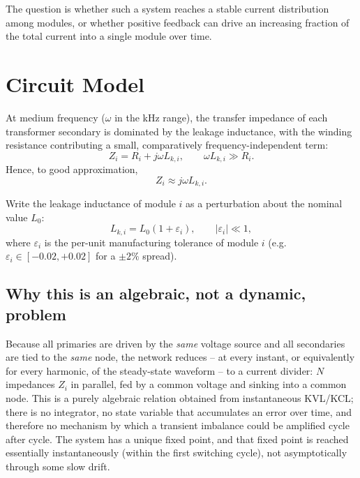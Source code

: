 \documentclass[11pt,a4paper]{article}
\begin{document}
The question is whether such a system reaches a stable current distribution among modules, or whether positive feedback can drive an increasing fraction of the total current into a single module over time.

\section{Circuit Model}

At medium frequency ($\omega$ in the kHz range), the transfer impedance of each transformer secondary is dominated by the leakage inductance, with the winding resistance contributing a small, comparatively frequency-independent term:
\begin{equation}
Z_i = R_i + j\omega L_{k,i}, \qquad \omega L_{k,i} \gg R_i .
\end{equation}
Hence, to good approximation,
\begin{equation}
Z_i \approx j\omega L_{k,i}.
\end{equation}

Write the leakage inductance of module $i$ as a perturbation about the nominal value $L_0$:
\begin{equation}
L_{k,i} = L_0\left(1+\varepsilon_i\right), \qquad |\varepsilon_i| \ll 1,
\end{equation}
where $\varepsilon_i$ is the per-unit manufacturing tolerance of module $i$ (e.g.\ $\varepsilon_i \in [-0.02, +0.02]$ for a $\pm 2\%$ spread).

\subsection{Why this is an algebraic, not a dynamic, problem}

Because all primaries are driven by the \emph{same} voltage source and all secondaries are tied to the \emph{same} node, the network reduces -- at every instant, or equivalently for every harmonic, of the steady-state waveform -- to a current divider: $N$ impedances $Z_i$ in parallel, fed by a common voltage and sinking into a common node. This is a purely algebraic relation obtained from instantaneous KVL/KCL; there is no integrator, no state variable that accumulates an error over time, and therefore no mechanism by which a transient imbalance could be amplified cycle after cycle. The system has a unique fixed point, and that fixed point is reached essentially instantaneously (within the first switching cycle), not asymptotically through some slow drift.
\end{document}
